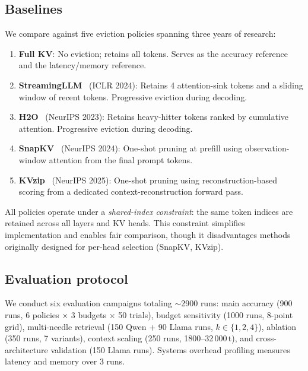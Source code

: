 \documentclass[runningheads]{llncs}
\begin{document}
\subsection{Baselines}

We compare against five eviction policies spanning three years of research:
\begin{enumerate}
\item \textbf{Full KV}: No eviction; retains all tokens.
  Serves as the accuracy reference and the latency/memory reference.

\item \textbf{StreamingLLM}~\cite{xiao2023streamingllm} (ICLR 2024):
  Retains 4 attention-sink tokens and a sliding window of recent tokens.
  Progressive eviction during decoding.

\item \textbf{H2O}~\cite{zhang2023h2o} (NeurIPS 2023):
  Retains heavy-hitter tokens ranked by cumulative attention.
  Progressive eviction during decoding.

\item \textbf{SnapKV}~\cite{li2024snapkv} (NeurIPS 2024):
  One-shot pruning at prefill using observation-window attention from the
  final prompt tokens.

\item \textbf{KVzip}~\cite{he2025kvzip} (NeurIPS 2025):
  One-shot pruning using reconstruction-based scoring from a dedicated
  context-reconstruction forward pass.
\end{enumerate}

All policies operate under a \emph{shared-index constraint}: the same
token indices are retained across all layers and KV heads.
This constraint simplifies implementation and enables fair comparison,
though it disadvantages methods originally designed for per-head selection
(SnapKV, KVzip).

\subsection{Evaluation protocol}

We conduct six evaluation campaigns totaling ${\sim}$2900 runs:
main accuracy (900 runs, 6 policies $\times$ 3 budgets $\times$ 50 trials),
budget sensitivity (1000 runs, 8-point grid),
multi-needle retrieval (150 Qwen + 90 Llama runs, $k{\in}\{1,2,4\}$),
ablation (350 runs, 7 variants),
context scaling (250 runs, 1800--32\,000\,t),
and cross-architecture validation (150 Llama runs).
Systems overhead profiling measures latency and memory over 3 runs.
\end{document}
